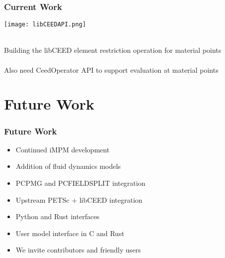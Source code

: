 \documentclass{beamer}
\begin{document}

\begin{frame}
\begin{center}
\frametitle{Current Work}

\begin{center}
\texttt{[image: libCEEDAPI.png]}
\end{center}

~\\

Building the libCEED element restriction operation for material points\\

~\\

Also need CeedOperator API to support evaluation at material points\\

\end{center}
\end{frame}

\section{Future Work}

\begin{frame}
\begin{center}
\frametitle{Future Work}

\begin{itemize}

\item Continued iMPM development\\

\item Addition of fluid dynamics models\\

\item PCPMG and PCFIELDSPLIT integration\\

\item Upstream PETSc + libCEED integration\\

\item Python and Rust interfaces\\

\item User model interface in C and Rust\\

\item We invite contributors and friendly users\\

\end{itemize}

\end{center}
\end{frame}
 
\end{document}
